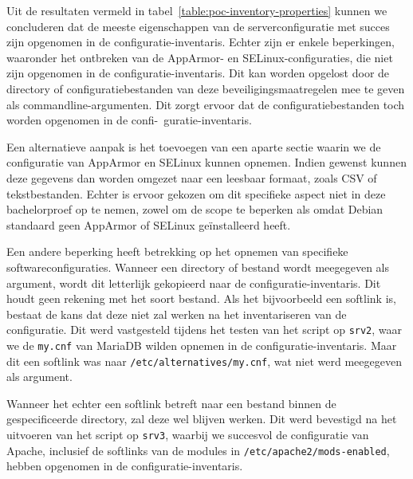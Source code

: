 Uit de resultaten vermeld in tabel~\ref{table:poc-inventory-properties} kunnen we concluderen dat de meeste eigenschappen van de serverconfiguratie met succes zijn opgenomen in de configuratie-inventaris.
Echter zijn er enkele beperkingen, waaronder het ontbreken van de AppArmor- en SELinux-configuraties, die niet zijn opgenomen in de configuratie-inventaris.
Dit kan worden opgelost door de directory of configuratiebestanden van deze beveiligingsmaatregelen mee te geven als commandline-argumenten.
Dit zorgt ervoor dat de configuratiebestanden toch worden opgenomen in de confi-\ guratie-inventaris.

Een alternatieve aanpak is het toevoegen van een aparte sectie waarin we de configuratie van AppArmor en SELinux kunnen opnemen.
Indien gewenst kunnen deze gegevens dan worden omgezet naar een leesbaar formaat, zoals CSV of tekstbestanden.
Echter is ervoor gekozen om dit specifieke aspect niet in deze bachelorproef op te nemen, zowel om de scope te beperken als omdat Debian standaard geen AppArmor of SELinux ge\"installeerd heeft.

Een andere beperking heeft betrekking op het opnemen van specifieke softwareconfiguraties.
Wanneer een directory of bestand wordt meegegeven als argument, wordt dit letterlijk gekopieerd naar de configuratie-inventaris.
Dit houdt geen rekening met het soort bestand.
Als het bijvoorbeeld een softlink is, bestaat de kans dat deze niet zal werken na het inventariseren van de configuratie.
Dit werd vastgesteld tijdens het testen van het script op \texttt{srv2}, waar we de \texttt{my.cnf} van MariaDB wilden opnemen in de configuratie-inventaris.
Maar dit een softlink was naar \texttt{/etc/alternatives/my.cnf}, wat niet werd meegegeven als argument.

Wanneer het echter een softlink betreft naar een bestand binnen de gespecificeerde directory, zal deze wel blijven werken.
Dit werd bevestigd na het uitvoeren van het script op \texttt{srv3}, waarbij we succesvol de configuratie van Apache, inclusief de softlinks van de modules in \texttt{/etc/apache2/mods-enabled}, hebben opgenomen in de configuratie-inventaris.

